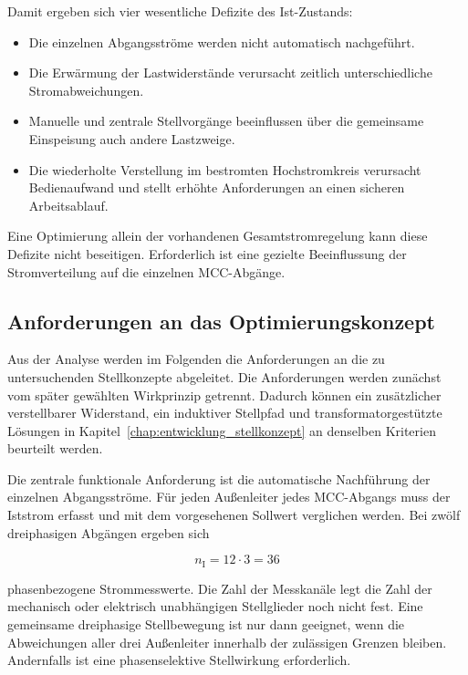 Damit ergeben sich vier wesentliche Defizite des Ist-Zustands:

\begin{itemize}
    \item Die einzelnen Abgangsströme werden nicht automatisch nachgeführt.
    \item Die Erwärmung der Lastwiderstände verursacht zeitlich
    unterschiedliche Stromabweichungen.
    \item Manuelle und zentrale Stellvorgänge beeinflussen über die
    gemeinsame Einspeisung auch andere Lastzweige.
    \item Die wiederholte Verstellung im bestromten Hochstromkreis verursacht
    Bedienaufwand und stellt erhöhte Anforderungen an einen sicheren
    Arbeitsablauf.
\end{itemize}

Eine Optimierung allein der vorhandenen Gesamtstromregelung kann diese
Defizite nicht beseitigen. Erforderlich ist eine gezielte Beeinflussung der
Stromverteilung auf die einzelnen MCC-Abgänge.


\subsection{Anforderungen an das Optimierungskonzept}
\label{sec:anforderungen_optimierung}

Aus der Analyse werden im Folgenden die Anforderungen an die zu
untersuchenden Stellkonzepte abgeleitet. Die Anforderungen werden zunächst
vom später gewählten Wirkprinzip getrennt. Dadurch können ein zusätzlicher
verstellbarer Widerstand, ein induktiver Stellpfad und
transformatorgestützte Lösungen in Kapitel~\ref{chap:entwicklung_stellkonzept}
an denselben Kriterien beurteilt werden.

Die zentrale funktionale Anforderung ist die automatische Nachführung der
einzelnen Abgangsströme. Für jeden Außenleiter jedes MCC-Abgangs muss der
Iststrom erfasst und mit dem vorgesehenen Sollwert verglichen werden. Bei
zwölf dreiphasigen Abgängen ergeben sich

\begin{equation}
    n_\mathrm{I}
    =
    12\cdot 3
    =
    36
    \label{eq:anzahl_modulstromkanaele}
\end{equation}

phasenbezogene Strommesswerte. Die Zahl der Messkanäle legt die Zahl der
mechanisch oder elektrisch unabhängigen Stellglieder noch nicht fest. Eine
gemeinsame dreiphasige Stellbewegung ist nur dann geeignet, wenn die
Abweichungen aller drei Außenleiter innerhalb der zulässigen Grenzen bleiben.
Andernfalls ist eine phasenselektive Stellwirkung erforderlich.

